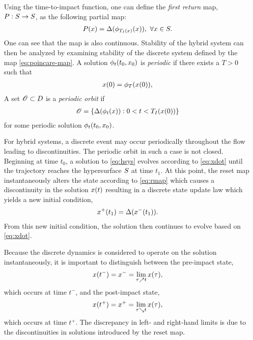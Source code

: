 Using the time-to-impact function, one can define the {\em \Poincare{} first
  return} map, $P : S \to S$, as the following partial map:
%
\begin{align}
  \label{eq:poincare-map}
  P(x)  = \Delta(\phi_{T_{I}(x)}(x)), \ \forall x \in S.
\end{align}
%
One can see that the \Poincare{} map is also continuous.
%
Stability of the hybrid system can then be analyzed by examining stability of
the discrete system \cite{Morris2009} defined by the \Poincare{} map
\eqref{eq:poincare-map}.
%
A solution $\phi_{t}(t_{0}, x_{0})$ is {\em periodic} if there exists a $T > 0$
such that
\begin{align*}
  x(0) = \phi_{T}(x(0)),
\end{align*}
%
A set ${\mathscr O} \subset D$ is a {\em periodic orbit} if
\begin{align*}
  {\mathscr O} = \{ \Delta(\phi_{t}(x)) : 0 < t < T_{I}(x(0)) \}
\end{align*}
for some periodic solution $\phi_{t}(t_{0}, x_{0})$.

For hybrid systems, a discrete event may occur periodically throughout the flow
leading to discontinuities.
%
The periodic orbit in such a case is not closed.
%
Beginning at time $t_{0}$, a solution to \eqref{eq:hsys} evolves according to
\eqref{eq:xdot} until the trajectory reaches the hypersurface $S$ at time
$t_{1}$.
%
At this point, the reset map instantaneously alters the state according to
\eqref{eq:rmap} which causes a discontinuity in the solution $x(t)$ resulting
in a discrete state update law which yields a new initial condition,
\begin{align*}
  x^{+}(t_{1}) = \Delta(x^{-}(t_{1})).
\end{align*}
%
From this new initial condition, the solution then continues to evolve based on
\eqref{eq:xdot}.

Because the discrete dynamics is considered to operate on the solution
instantaneously, it is important to distinguish between the pre-impact state,
\begin{align*}
  x(t^{-}) = x^{-} = \lim_{\tau \nearrow t} x(\tau),
\end{align*}
which occurs at time $t^{-}$, and the post-impact state,
\begin{align*}
  x(t^{+}) = x^{+} = \lim_{\tau \searrow t} x(\tau),
\end{align*}
which occurs at time $t^{+}$.
%
The discrepancy in left- and right-hand limits is due to the discontinuities in
solutions introduced by the reset map.
%

